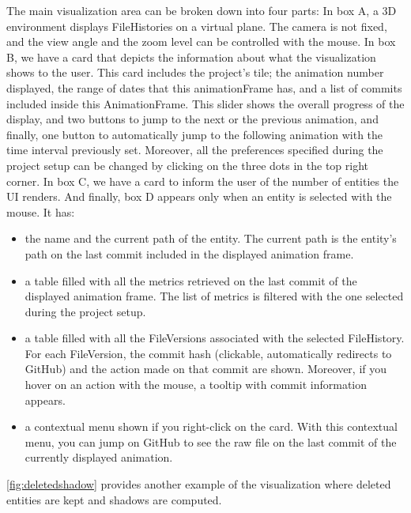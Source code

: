 The main visualization area can be broken down into four parts: 
In box A, a 3D environment displays FileHistories on a virtual plane. The camera is not fixed, and the view angle and the zoom level can be controlled with the mouse. 
In box B, we have a card that depicts the information about what the visualization shows to the user. 
This card includes the project's tile; the animation number displayed, the range of dates that this animationFrame has, and a list of commits included inside this AnimationFrame. This slider shows the overall progress of the display, and two buttons to jump to the next or the previous animation, and finally, one button to automatically jump to the following animation with the time interval previously set. 
Moreover, all the preferences specified during the project setup can be changed by clicking on the three dots in the top right corner.
In box C, we have a card to inform the user of the number of entities the UI renders. 
And finally, box D appears only when an entity is selected with the mouse. 
It has: 
\begin{itemize}
    \item the name and the current path of the entity. The current path is the entity's path on the last commit included in the displayed animation frame. 
    \item a table filled with all the metrics retrieved on the last commit of the displayed animation frame. The list of metrics is filtered with the one selected during the project setup. 
    \item a table filled with all the FileVersions associated with the selected FileHistory. For each FileVersion, the commit hash (clickable, automatically redirects to GitHub) and the action made on that commit are shown. Moreover, if you hover on an action with the mouse, a tooltip with commit information appears.
    \item a contextual menu shown if you right-click on the card. With this contextual menu, you can jump on GitHub to see the raw file on the last commit of the currently displayed animation. 
\end{itemize}

\autoref{fig:deletedshadow} provides another example of the visualization where deleted entities are kept and shadows are computed. 

